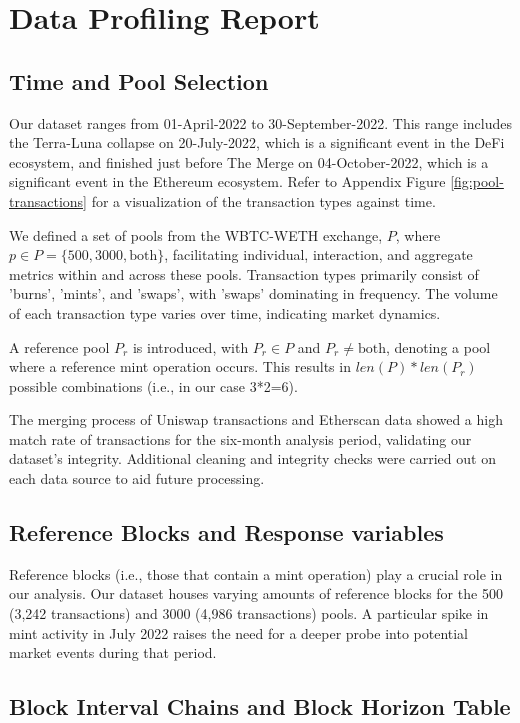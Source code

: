 \documentclass{article}
\begin{document}
\section{Data Profiling Report}

\subsection{Time and Pool Selection}

Our dataset ranges from 01-April-2022 to 30-September-2022. This range includes the Terra-Luna collapse on 20-July-2022, which is a significant event in the DeFi ecosystem, and finished just before The Merge on 04-October-2022, which is a significant event in the Ethereum ecosystem. Refer to Appendix Figure \ref{fig:pool-transactions} for a visualization of the transaction types against time.

We defined a set of pools from the WBTC-WETH exchange, \(P\), where \(p \in P=\{500,3000,\text{both}\}\), facilitating individual, interaction, and aggregate metrics within and across these pools. Transaction types primarily consist of 'burns', 'mints', and 'swaps', with 'swaps' dominating in frequency. The volume of each transaction type varies over time, indicating market dynamics. 

A reference pool \(P_r\) is introduced, with \(P_r \in P\) and \(P_r \neq \text{both}\), denoting a pool where a reference mint operation occurs. This results in \(len(P) * len(P_r)\) possible combinations (i.e., in our case 3*2=6).

The merging process of Uniswap transactions and Etherscan data showed a high match rate of transactions for the six-month analysis period, validating our dataset's integrity. Additional cleaning and integrity checks were carried out on each data source to aid future processing.

\subsection{Reference Blocks and Response variables}

Reference blocks (i.e., those that contain a mint operation) play a crucial role in our analysis. Our dataset houses varying amounts of reference blocks for the 500 (3,242 transactions) and 3000 (4,986 transactions) pools. A particular spike in mint activity in July 2022 raises the need for a deeper probe into potential market events during that period.

\subsection{Block Interval Chains and Block Horizon Table}
\end{document}
